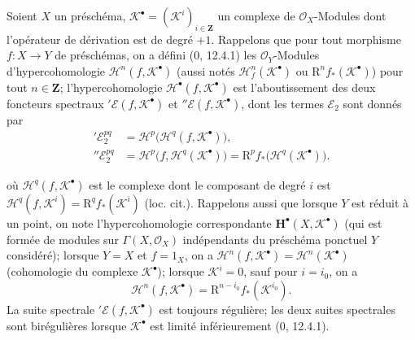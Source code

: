 \begin{env}[6.2.1]
Soient $X$ un préschéma,
$\mathscr K^\bullet=(\mathscr K^i)_{i\in\mathbf Z}$ un complexe de
$\mathscr O_X$-Modules dont l'opérateur de dérivation est de degré $+1$.
Rappelons que pour tout morphisme $f:X\to Y$ de préschémas, on a défini
(0, 12.4.1) les $\mathscr O_Y$-Modules d'hypercohomologie
$\mathscr H^n(f,\mathscr K^\bullet)$ (aussi notés
$\mathscr H_f^n(\mathscr K^\bullet)$ ou
$\mathrm R^n f_*(\mathscr K^\bullet)$) pour tout $n\in\mathbf Z$;
l'hypercohomologie $\mathscr H^\bullet(f,\mathscr K^\bullet)$ est
l'aboutissement des deux foncteurs spectraux
$'\mathscr E(f,\mathscr K^\bullet)$ et
$''\mathscr E(f,\mathscr K^\bullet)$, dont les termes $\mathscr E_2$ sont
donnés par
\begin{align}
  '\mathscr E_2^{pq}
    &=\mathscr H^p\bigl(\mathscr H^q(f,\mathscr K^\bullet)\bigr),
    \tag{6.2.1.1}\label{III.6.2.1.1.fr}\\
  ''\mathscr E_2^{pq}
    &=\mathscr H^p\bigl(f,\mathscr H^q(\mathscr K^\bullet)\bigr)
      =\mathrm R^p f_*\bigl(\mathscr H^q(\mathscr K^\bullet)\bigr).
    \tag{6.2.1.2}\label{III.6.2.1.2.fr}
\end{align}


où $\mathscr H^q(f,\mathscr K^\bullet)$ est le complexe dont le composant de
degré $i$ est
$\mathscr H^q(f,\mathscr K^i)=\mathrm R^q f_*(\mathscr K^i)$ (loc. cit.).
Rappelons aussi que lorsque $Y$ est réduit à un point, on note
l'hypercohomologie correspondante $\mathbf H^\bullet(X,\mathscr K^\bullet)$
(qui est formée de modules sur $\Gamma(X,\mathscr O_X)$ indépendants du
préschéma ponctuel $Y$ considéré); lorsque $Y=X$ et $f=1_X$, on a
$\mathscr H^n(f,\mathscr K^\bullet)=\mathscr H^n(\mathscr K^\bullet)$
(cohomologie du complexe $\mathscr K^\bullet$); lorsque
$\mathscr K^i=0$, sauf pour $i=i_0$, on a
\[
  \mathscr H^n(f,\mathscr K^\bullet)
    =\mathrm R^{n-i_0}f_*(\mathscr K^{i_0}).
\]
La suite spectrale $'\mathscr E(f,\mathscr K^\bullet)$ est toujours
régulière; les deux suites spectrales sont birégulières lorsque
$\mathscr K^\bullet$ est limité inférieurement (0, 12.4.1).


\end{env}

